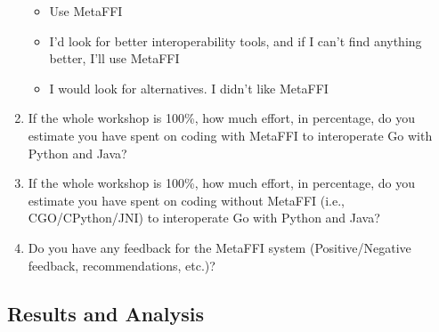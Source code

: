 \documentclass[sigplan,10pt,manuscript,nonacm]{acmart}
\begin{document}
\begin{enumerate}
    \begin{itemize}
        \vspace{-2mm}\item Use MetaFFI
        \vspace{-2mm}\item I'd look for better interoperability tools, and if I can't find anything better, I'll use MetaFFI
        \vspace{-2mm}\item I would look for alternatives. I didn't like MetaFFI
    \end{itemize}
    \vspace{-2mm}\item If the whole workshop is 100\%, how much effort, in percentage, do you estimate you have spent on coding with MetaFFI to interoperate Go with Python and Java?
    \vspace{-2mm}\item If the whole workshop is 100\%, how much effort, in percentage, do you estimate you have spent on coding without MetaFFI (i.e., CGO/CPython/JNI) to interoperate Go with Python and Java?
    \vspace{-2mm}\item Do you have any feedback for the MetaFFI system (Positive/Negative feedback, recommendations, etc.)?
\end{enumerate}

\subsection{Results and Analysis}
\end{document}
